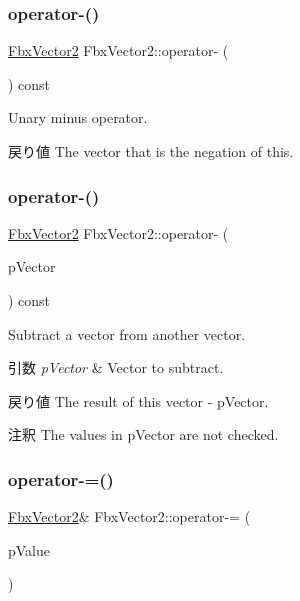\subsubsection{\texorpdfstring{operator-\/()}{operator-()}\hspace{0.1cm}{\footnotesize\ttfamily [2/3]}}
{\footnotesize\ttfamily \hyperlink{class_fbx_vector2}{Fbx\+Vector2} Fbx\+Vector2\+::operator-\/ (\begin{DoxyParamCaption}{ }\end{DoxyParamCaption}) const}

Unary minus operator. \begin{DoxyReturn}{戻り値}
The vector that is the negation of {\ttfamily this}. 
\end{DoxyReturn}
\mbox{\label{class_fbx_vector2_ac0034032780f2e53ac9775bb8302b45d}} 
\subsubsection{\texorpdfstring{operator-\/()}{operator-()}\hspace{0.1cm}{\footnotesize\ttfamily [3/3]}}
{\footnotesize\ttfamily \hyperlink{class_fbx_vector2}{Fbx\+Vector2} Fbx\+Vector2\+::operator-\/ (\begin{DoxyParamCaption}\item[{const \hyperlink{class_fbx_vector2}{Fbx\+Vector2} \&}]{p\+Vector }\end{DoxyParamCaption}) const}

Subtract a vector from another vector. 
\begin{DoxyParams}{引数}
{\em p\+Vector} & Vector to subtract. \\
\hline
\end{DoxyParams}
\begin{DoxyReturn}{戻り値}
The result of this vector -\/ p\+Vector. 
\end{DoxyReturn}
\begin{DoxyRemark}{注釈}
The values in p\+Vector are not checked. 
\end{DoxyRemark}
\mbox{\label{class_fbx_vector2_a9dd2b74e182efcb4c6ccc83f3aa6b111}} 
\subsubsection{\texorpdfstring{operator-\/=()}{operator-=()}\hspace{0.1cm}{\footnotesize\ttfamily [1/2]}}
{\footnotesize\ttfamily \hyperlink{class_fbx_vector2}{Fbx\+Vector2}\& Fbx\+Vector2\+::operator-\/= (\begin{DoxyParamCaption}\item[{double}]{p\+Value }\end{DoxyParamCaption})}

